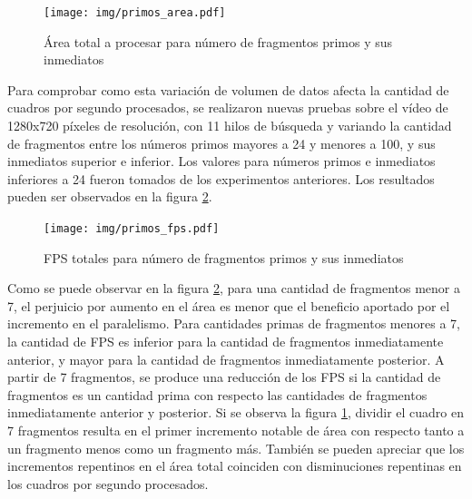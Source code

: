 \begin{figure}[!h]

	\texttt{[image: img/primos\_area.pdf]}
	\caption{Área total a procesar para número de fragmentos primos y sus inmediatos}
	\label{primosArea}

\end{figure}

Para comprobar como esta variación de volumen de datos afecta la cantidad de
cuadros por segundo procesados, se realizaron nuevas pruebas sobre el vídeo de
1280x720 píxeles de resolución, con 11 hilos de búsqueda y variando la cantidad
de fragmentos entre los números primos mayores a 24 y menores a 100, y sus
inmediatos superior e inferior. Los valores para números primos e inmediatos
inferiores a 24 fueron tomados de los experimentos anteriores. Los resultados
pueden ser observados en la figura \ref{primosFPS}.

\begin{figure}[!h]

	\texttt{[image: img/primos\_fps.pdf]}
	\caption{FPS totales para número de fragmentos primos y sus inmediatos}
	\label{primosFPS}

\end{figure}

Como se puede observar en la figura \ref{primosFPS}, para una cantidad de
fragmentos menor a 7, el perjuicio por aumento en el área es menor que el
beneficio aportado por el incremento en el paralelismo. Para cantidades primas
de fragmentos menores a 7, la cantidad de FPS es inferior para la cantidad de
fragmentos inmediatamente anterior, y mayor para la cantidad de fragmentos
inmediatamente posterior. A partir de 7 fragmentos, se produce una reducción de
los FPS si la cantidad de fragmentos es un cantidad prima con respecto las
cantidades de fragmentos inmediatamente anterior y posterior. Si se observa la
figura \ref{primosArea}, dividir el cuadro en 7 fragmentos resulta en el primer
incremento notable de área con respecto tanto a un fragmento menos como un
fragmento más. También se pueden apreciar que los incrementos repentinos en el
área total coinciden con disminuciones repentinas en los cuadros por segundo
procesados.

